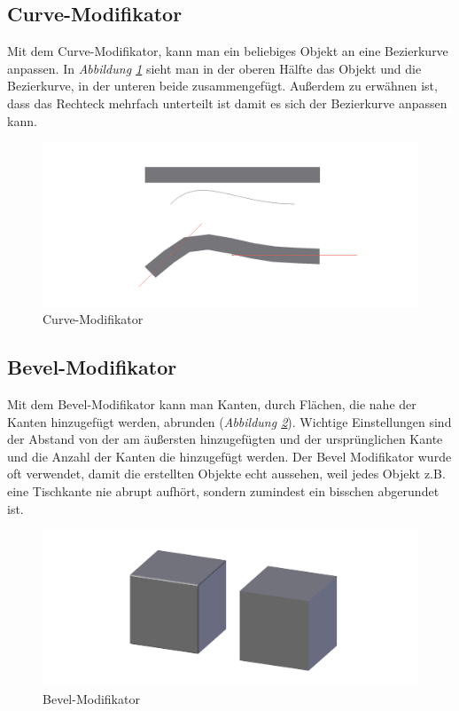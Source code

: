\subsection{Curve-Modifikator\citep{blender:curve_modifier}}
\label{Curve:heading}
Mit dem Curve-Modifikator, kann man ein beliebiges Objekt an eine Bezierkurve anpassen. In \textit{Abbildung \ref{modifikatoren:image4}} sieht man
in der oberen Hälfte das Objekt und die Bezierkurve, in der unteren beide zusammengefügt.
Außerdem zu erwähnen ist, dass das Rechteck mehrfach unterteilt ist damit es sich der Bezierkurve anpassen kann.
\begin{figure}[h]
    \centering
    \includegraphics[width=.8\textwidth]{images/Modifikatoren-Curve.png}
    \caption{Curve-Modifikator}
    \label{modifikatoren:image4}
\end{figure}

\subsection{Bevel-Modifikator\citep{blender:bevel_modifier}}
\label{Bevel:heading}
Mit dem Bevel-Modifikator kann man Kanten, durch Flächen, die nahe der Kanten hinzugefügt werden, abrunden (\textit{Abbildung \ref{modifikatoren:image5}}).
Wichtige Einstellungen sind der Abstand von der am äußersten hinzugefügten und der ursprünglichen Kante und die Anzahl der Kanten die hinzugefügt werden.
Der Bevel Modifikator wurde oft verwendet, damit die erstellten Objekte echt aussehen, weil jedes Objekt z.B. eine Tischkante nie abrupt
aufhört, sondern zumindest ein bisschen abgerundet ist.
\begin{figure}[h]
    \centering
    \includegraphics[width=.8\textwidth]{images/Modifikatoren-Bevel.png}
    \caption{Bevel-Modifikator}
    \label{modifikatoren:image5}
\end{figure}


